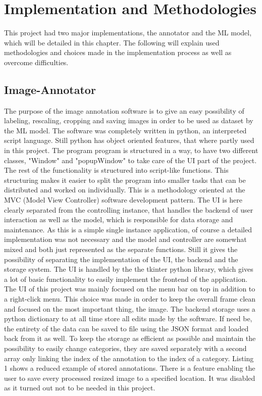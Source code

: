 \section{Implementation and Methodologies}

This project had two major implementations, the annotator and the ML model,
which will be detailed in this chapter. The following will explain used
methodologies and choices made in the implementation process as well as overcome
difficulties. 

\subsection{Image-Annotator}

The purpose of the image annotation software is to give an easy possibility of
labeling, rescaling, cropping and saving images in order to be used as dataset
by the ML model.
\newline
The software was completely written in python, an interpreted script language.
Still python has object oriented features, that where partly used in this
project. 
\newline
The program program is structured in a way, to have two different classes,
"Window" and "popupWindow" to take care of the UI part of the project. The rest
of the functionality is structured into script-like functions. This structuring
makes it easier to split the program into smaller tasks that can be distributed
and worked on individually. This is a methodology oriented at the MVC (Model
View Controller) software development pattern. The UI is here clearly separated
from the controlling instance, that handles the backend of user interaction as
well as the model, which is responsible for data storage and maintenance. As
this is a simple single instance application, of course a detailed
implementation was not necessary and the model and controller are somewhat mixed
and both just represented as the separate functions. Still it gives the
possibility of separating the implementation of the UI, the backend and the
storage system.
\newline
The UI is handled by the the tkinter python library, which gives a lot of basic
functionality to easily implement the frontend of the application. The UI of
this project was mainly focused on the menu bar on top in addition to a
right-click menu. This choice was made in order to keep the overall frame clean
and focused on the most important thing, the image.
\newline
The backend storage uses a python dictionary to at all time store all edits made
by the software. If need be, the entirety of the data can be saved to file using
the JSON format and loaded back from it as well. To keep the storage as
efficient as possible and maintain the possibility to easily change categories,
they are saved separately with a second array only linking the index of
the annotation to the index of a category. Listing 1 shows a reduced example of
stored annotations. There is a feature enabling the user to save every processed
resized image to a specified location. It was disabled as it turned out not to
be needed in this project. 

